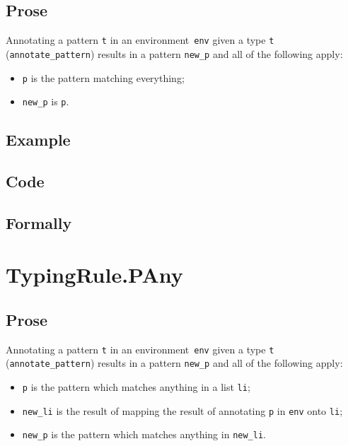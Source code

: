 \documentclass{book}
\begin{document}
  \subsection{Prose}
   Annotating a pattern \texttt{t} in an environment~\texttt{env} given a type \texttt{t} (\texttt{annotate\_pattern}) results in a pattern \texttt{new\_p} and all of the following apply:
   \begin{itemize}
   \item \texttt{p} is the pattern matching everything;
   \item \texttt{new\_p} is \texttt{p}.
   \end{itemize}

  \subsection{Example}

  \subsection{Code}

\begin{emptyformal}
    \subsection{Formally}
\end{emptyformal}


\section{TypingRule.PAny\label{sec:TypingRule.PAny}}

  \subsection{Prose}
   Annotating a pattern \texttt{t} in an environment~\texttt{env} given a type \texttt{t} (\texttt{annotate\_pattern}) results in a pattern \texttt{new\_p} and all of the following apply:
   \begin{itemize}
   \item \texttt{p} is the pattern which matches anything in a list \texttt{li};
   \item \texttt{new\_li} is the result of mapping the result of annotating \texttt{p} in \texttt{env} onto \texttt{li};
   \item \texttt{new\_p} is the pattern which matches anything in \texttt{new\_li}.
   \end{itemize}
\end{document}
